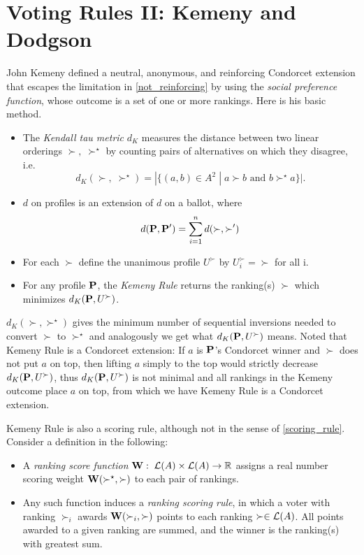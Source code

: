 \section{Voting Rules II: Kemeny and Dodgson}

John Kemeny defined a neutral, anonymous, and reinforcing Condorcet extension that escapes the limitation in \cref{not_reinforcing} by using the \textit{social preference function}, whose outcome is a set of one or more rankings. Here is his basic method.

\begin{definition}
    \begin{itemize}
        \item The \emph{Kendall tau metric} $d_K$ measures the distance between two linear orderings $\succ,\;\succ^\star$ by counting pairs of alternatives on which they disagree, i.e. 
        $$d_K (\succ,\;\succ^\star) = |\{(a,b) \in A^2 \;|\; a \succ b \mbox{ and } b \succ^\star a\}|.$$
        \item $d$ on profiles is an extension of $d$ on a ballot, where
        $$d(\mathbf{P},\mathbf{P}') = \sum_{i = 1}^{n} d (\succ, \succ')$$
        \item For each $\succ$ define the unanimous profile $U^\succ$ by $U^\succ_i = \succ$ for all i.
        \item For any profile $\mathbf{P}$, the \emph{Kemeny Rule} returns the ranking(s) $\succ$ which minimizes $d_K(\mathbf{P},U^\succ)$.
    \end{itemize}
\end{definition}

$d_K(\succ,\succ^\star)$ gives the minimum number of sequential inversions needed to convert $\succ$ to $\succ^\star$ and analogously we get what $d_K (\mathbf{P},U^\succ)$ means. Noted that Kemeny Rule is a Condorcet extension: If $a$ is $\mathbf{P}$'s Condorcet winner and $\succ$ does not put $a$ on top, then lifting $a$ simply to the top would strictly decrease $d_K(\mathbf{P},U^\succ)$, thus $d_K(\mathbf{P},U^\succ)$ is not minimal and all rankings in the Kemeny outcome place $a$ on top, from which we have Kemeny Rule is a Condorcet extension.

Kemeny Rule is also a scoring rule, although not in the sense of \cref{scoring_rule}. Consider a definition in the following:

\begin{definition}
    \begin{itemize}
        \item A \emph{ranking score function} $\mathbf{W}:\; \mathcal{L}(A) \times \mathcal{L}(A) \to \mathbb{R}$ assigns a real number scoring weight $\mathbf{W}(\succ^\star, \succ)$ to each pair of rankings.
        \item Any such function induces a \emph{ranking scoring rule}, in which a voter with ranking $\succ_i$ awards $\mathbf{W}(\succ_i, \succ)$ points to each ranking $\succ \in \mathcal{L}(A)$. All points awarded to a given ranking are summed, and the winner is the ranking(s) with greatest sum.
    \end{itemize}
\end{definition}

